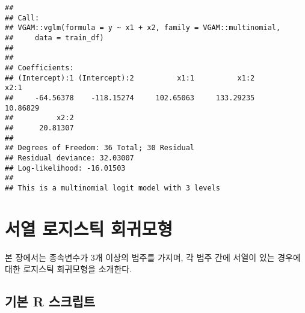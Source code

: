 \documentclass[
]{book}
\begin{document}
\begin{verbatim}
## 
## Call:
## VGAM::vglm(formula = y ~ x1 + x2, family = VGAM::multinomial, 
##     data = train_df)
## 
## 
## Coefficients:
## (Intercept):1 (Intercept):2          x1:1          x1:2          x2:1 
##     -64.56378    -118.15274     102.65063     133.29235      10.86829 
##          x2:2 
##      20.81307 
## 
## Degrees of Freedom: 36 Total; 30 Residual
## Residual deviance: 32.03007 
## Log-likelihood: -16.01503 
## 
## This is a multinomial logit model with 3 levels
\end{verbatim}

\hypertarget{ordinal-logistic-regression}{%
\section{서열 로지스틱 회귀모형}\label{ordinal-logistic-regression}}

본 장에서는 종속변수가 3개 이상의 범주를 가지며, 각 범주 간에 서열이 있는 경우에 대한 로지스틱 회귀모형을 소개한다.

\hypertarget{ordinal-logistic-basic-script}{%
\subsection{기본 R 스크립트}\label{ordinal-logistic-basic-script}}
\end{document}
